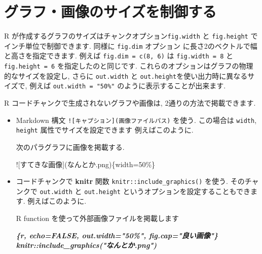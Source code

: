 \documentclass[
  11pt,
  lualatex,ja=standard,jafont=noto]{bxjsreport}
\newenvironment{Shaded}{\begin{snugshade}}{\end{snugshade}}
\newcommand{\AlertTok}[1]{\textcolor[rgb]{0.94,0.16,0.16}{#1}}
\newcommand{\InformationTok}[1]{\textcolor[rgb]{0.56,0.35,0.01}{\textbf{\textit{#1}}}}
\newcommand{\NormalTok}[1]{#1}
\begin{document}
\hypertarget{figure-size}{%
\section{グラフ・画像のサイズを制御する}\label{figure-size}}

R が作成するグラフのサイズはチャンクオプション\texttt{fig.width}  と \texttt{fig.height} でインチ単位で制御できます. 同様に \texttt{fig.dim} オプション に長さ2のベクトルで幅と高さを指定できます. 例えば \texttt{fig.dim = c(8, 6)} は \texttt{fig.width = 8} と \texttt{fig.height = 6} を指定したのと同じです. これらのオプションはグラフの物理的なサイズを設定し, さらに \texttt{out.width} と \texttt{out.height}を使い出力時に異なるサイズで, 例えば \texttt{out.width = "50\%"} のように表示することが出来ます.

R コードチャンクで生成されないグラフや画像は, 2通りの方法で掲載できます.

\begin{itemize}
\item
  Markdown 構文 \texttt{!{[}キャプション{]}(画像ファイルパス)} を使う. この場合は \texttt{width}, \texttt{height} 属性でサイズを設定できます 例えばこのように.

\begin{Shaded}
\begin{Highlighting}[]
\NormalTok{次のパラグラフに画像を掲載する.}

\AlertTok{![すてきな画像](なんとか.png)}\NormalTok{\{width=50\%\}}
\end{Highlighting}
\end{Shaded}
\item
  コードチャンクで \textbf{knitr} 関数 \texttt{knitr::include\_graphics()} を使う. そのチャンクで \texttt{out.width} と \texttt{out.height} というオプションを設定することもできます. 例えばこのように.

\begin{Shaded}
\begin{Highlighting}[]
\NormalTok{R function を使って外部画像ファイルを掲載します}

\InformationTok{\textasciigrave{}\textasciigrave{}\textasciigrave{}\{r, echo=FALSE, out.width="50\%", fig.cap="良い画像"\}}
\InformationTok{knitr::include\_graphics("なんとか.png")}
\InformationTok{\textasciigrave{}\textasciigrave{}\textasciigrave{}}
\end{Highlighting}
\end{Shaded}
\end{itemize}
\end{document}
